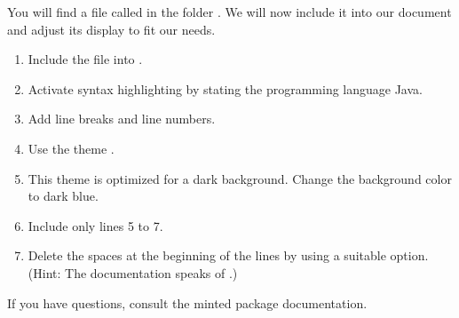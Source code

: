 You will find a file called  in the folder 
.
We will now include it into our document and adjust its display to fit our needs.

\begin{enumerate}
  \item Include the file into 
  .
  \item Activate syntax highlighting by stating the programming language Java.
  \item Add line breaks and line numbers.
  \item Use the theme .
  \item This theme is optimized for a dark background. Change the background color to dark blue.
  \item Include only lines 5 to 7.
  \item Delete the spaces at the beginning of the lines by using a suitable 
  option. (Hint: The documentation speaks of .)
\end{enumerate}

\noindent If you have questions, consult the minted package documentation.

\usemintedstyle{} %
